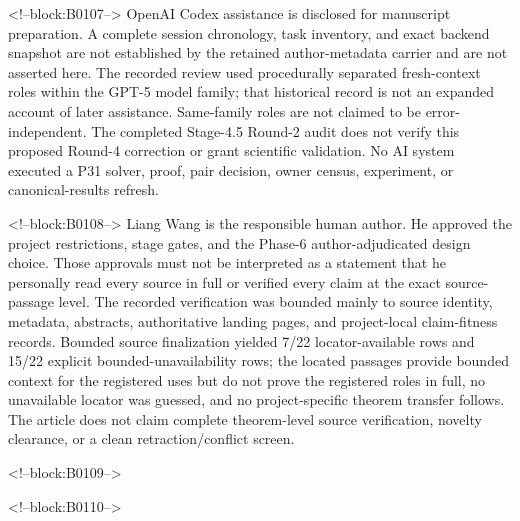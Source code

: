 \documentclass[11pt]{article}
\begin{document}
<!--block:B0107-->
OpenAI Codex assistance is disclosed for manuscript preparation. A complete
session chronology, task inventory, and exact backend snapshot are not
established by the retained author-metadata carrier and are not asserted here.
The recorded review used procedurally separated fresh-context roles within the
GPT-5 model family; that historical record is not an expanded account of later
assistance. Same-family roles are not claimed to be error-independent. The
completed Stage-4.5 Round-2 audit does not verify this proposed Round-4
correction or grant scientific validation. No AI system executed a P31 solver,
proof, pair decision, owner census, experiment, or canonical-results refresh.

<!--block:B0108-->
Liang Wang is the responsible human author. He approved the project
restrictions, stage gates, and the Phase-6 author-adjudicated design
choice. Those approvals must not be interpreted as a statement that he
personally read every source in full or verified every claim at the exact
source-passage level. The recorded verification was bounded mainly to
source identity, metadata, abstracts, authoritative landing pages, and
project-local claim-fitness records. Bounded source finalization yielded
7/22 locator-available rows and 15/22 explicit bounded-unavailability rows;
the located passages provide bounded context for the registered uses but do not
prove the registered roles in full, no unavailable locator was guessed, and no
project-specific theorem transfer follows. The
article does not claim complete theorem-level source verification, novelty
clearance, or a clean retraction/conflict screen.

<!--block:B0109-->



<!--block:B0110-->
\end{document}
